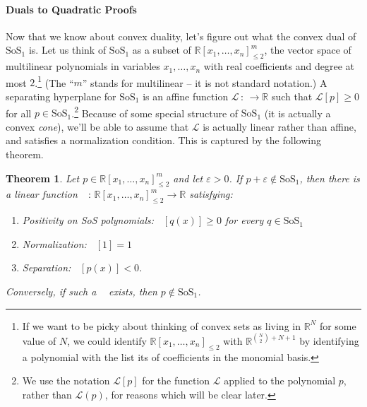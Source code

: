 \documentclass[11pt]{article}
\newtheorem{theorem}{Theorem}
\newcommand{\R}{\mathbb{R}} %
\renewcommand{\epsilon}{\varepsilon}
\newcommand{\eps}{\epsilon}
\newcommand{\cL}{\mathcal{L}}
\DeclareMathOperator{\pE}{\widetilde{\mathbb{E}}} %
\newcommand{\SoS}{\text{SoS}}
\begin{document}
\paragraph{Duals to Quadratic Proofs}
Now that we know about convex duality, let's figure out what the convex dual of $\SoS_1$ is.
Let us think of $\SoS_1$ as a subset of $\R[x_1,\ldots,x_n]_{\leq 2}^m$, the vector space of multilinear polynomials in variables $x_1,\ldots,x_n$ with real coefficients and degree at most $2$.\footnote{If we want to be picky about thinking of convex sets as living in $\R^N$ for some value of $N$, we could identify $\R[x_1,\ldots,x_n]_{\leq 2}$ with $\R^{\binom{N}{2} + N + 1}$ by identifying a polynomial with the list its of coefficients in the monomial basis.}
(The ``$m$'' stands for multilinear -- it is not standard notation.)
A separating hyperplane for $\SoS_1$ is an affine function $\cL \, : \,  \rightarrow \R$ such that $\cL[p] \geq 0$ for all $p \in \SoS_1$.\footnote{We use the notation $\cL[p]$ for the function $\cL$ applied to the polynomial $p$, rather than $\cL(p)$, for reasons which will be clear later.}
Because of some special structure of $\SoS_1$ (it is actually a convex \emph{cone}), we'll be able to assume that $\cL$ is actually linear rather than affine, and satisfies a normalization condition.
This is captured by the following theorem.
\begin{theorem}
  \label{thm:duality}
  Let $p \in \R[x_1,\ldots,x_n]_{\leq 2}^m$ and let $\eps > 0$.
  If $p + \epsilon \notin \SoS_1$, then there is a linear function $\pE \, : \, \R[x_1,\ldots,x_n]_{\leq 2}^m \rightarrow \R$ satisfying:
  \begin{enumerate}
  \item Positivity on SoS polynomials: $\pE[q(x)] \geq 0$ for every $q \in \SoS_1$
  \item Normalization: $\pE[1] = 1$
  \item Separation: $\pE[p(x)] < 0$.
  \end{enumerate}
  Conversely, if such a $\pE$ exists, then $p \notin \SoS_1$.
\end{theorem}
\end{document}
